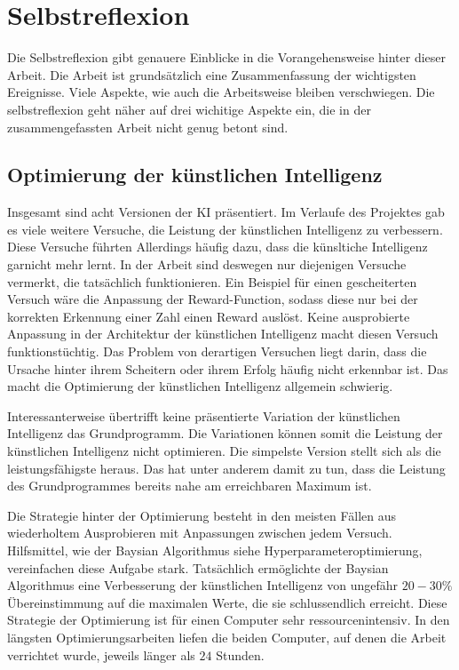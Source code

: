 \section{Selbstreflexion}
Die Selbstreflexion gibt genauere Einblicke in die Vorangehensweise hinter
dieser Arbeit. Die Arbeit ist grundsätzlich eine Zusammenfassung der wichtigsten
Ereignisse. Viele Aspekte, wie auch die Arbeitsweise bleiben verschwiegen. Die
selbstreflexion geht näher auf drei wichitige Aspekte ein, die in der
zusammengefassten Arbeit nicht genug betont sind.

\subsection{Optimierung der künstlichen Intelligenz}
Insgesamt sind acht Versionen der KI präsentiert. Im Verlaufe des Projektes gab
es viele weitere Versuche, die Leistung der künstlichen Intelligenz zu
verbessern. Diese Versuche führten Allerdings häufig dazu, dass die künsltiche
Intelligenz garnicht mehr lernt. In der Arbeit sind deswegen nur diejenigen
Versuche vermerkt, die tatsächlich funktionieren. Ein Beispiel für einen
gescheiterten Versuch wäre die Anpassung der Reward-Function, sodass diese nur
bei der korrekten Erkennung einer Zahl einen Reward auslöst. Keine
ausprobierte Anpassung in der Architektur der künstlichen Intelligenz macht
diesen Versuch funktionstüchtig. Das Problem von derartigen Versuchen liegt
darin, dass die Ursache hinter ihrem Scheitern oder ihrem Erfolg häufig nicht
erkennbar ist. Das macht die Optimierung der künstlichen Intelligenz allgemein
schwierig. 

Interessanterweise übertrifft keine präsentierte Variation der künstlichen
Intelligenz das Grundprogramm. Die Variationen können somit die Leistung der
künstlichen Intelligenz nicht optimieren. Die simpelste Version stellt sich als
die leistungsfähigste heraus. Das hat unter anderem damit zu tun, dass die
Leistung des Grundprogrammes bereits nahe am erreichbaren Maximum ist.

Die Strategie hinter der Optimierung besteht in den meisten Fällen aus
wiederholtem Ausprobieren mit Anpassungen zwischen jedem Versuch. Hilfsmittel,
wie der Baysian Algorithmus {siehe Hyperparameteroptimierung}, vereinfachen
diese Aufgabe stark. Tatsächlich ermöglichte der Baysian Algorithmus eine
Verbesserung der künstlichen Intelligenz von ungefähr $20-30\%$ Übereinstimmung
auf die maximalen Werte, die sie schlussendlich erreicht. Diese Strategie der
Optimierung ist für einen Computer sehr ressourcenintensiv. In den längsten
Optimierungsarbeiten liefen die beiden Computer, auf denen die Arbeit
verrichtet wurde, jeweils länger als $24$ Stunden.



